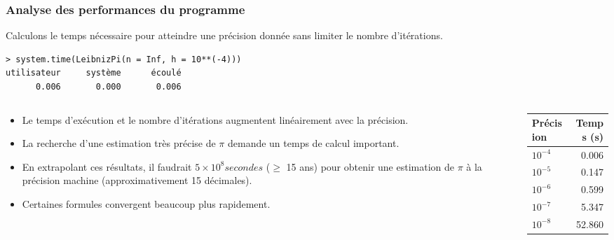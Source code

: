 \documentclass[10pt]{beamer}
\begin{document}
\begin{frame}[fragile]
  \frametitle{Analyse des performances du programme}
  Calculons le temps nécessaire pour atteindre une précision donnée sans limiter le nombre d'itérations.
  \begin{lstlisting}
> system.time(LeibnizPi(n = Inf, h = 10**(-4)))
utilisateur     système      écoulé 
      0.006       0.000       0.006 
    \end{lstlisting}

    
\begin{columns}[t]
\begin{column}{0.7\textwidth}
  \begin{itemize}
  \item Le temps d’exécution et le nombre d'itérations augmentent linéairement avec la précision.
  \item La recherche d’une estimation très précise de $\pi$ demande un temps de calcul important.
  
  \item En extrapolant ces résultats, il faudrait  $5 \times 10^8 secondes$ ($\geq$ 15 ans) pour obtenir une estimation de $\pi$ à la précision machine (approximativement 15 décimales).
  \item<alert@1> Certaines formules convergent beaucoup plus rapidement.
  \end{itemize}
\end{column}
\begin{column}{0.3\textwidth}
  \begin{table}[h]
    \centering
    \begin{tabular}{lr}
      \toprule
      Précision & Temps (s) \\
      \midrule
      $10^{-4}$ & 0.006     \\
      $10^{-5}$ & 0.147     \\
      $10^{-6}$ & 0.599     \\
      $10^{-7}$ & 5.347     \\
      $10^{-8}$ & 52.860    \\
      \bottomrule
    \end{tabular}
  \end{table}
\end{column}
\end{columns}
\end{frame}
\end{document}
